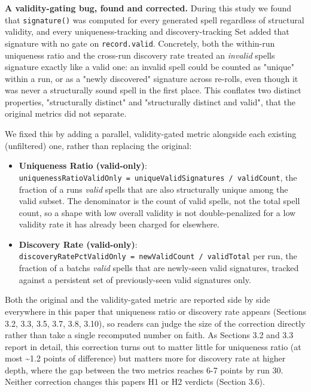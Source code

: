 \documentclass[
  10pt,
  twocolumn]{article}
\providecommand{\tightlist}{%
  \setlength{\itemsep}{0pt}\setlength{\parskip}{0pt}}
\begin{document}
\textbf{A validity-gating bug, found and corrected.} During this study
we found that \texttt{signature()} was computed for every generated
spell regardless of structural validity, and every uniqueness-tracking
and discovery-tracking Set added that signature with no gate on
\texttt{record.valid}. Concretely, both the within-run uniqueness ratio
and the cross-run discovery rate treated an \emph{invalid}
spell\textquotesingle s signature exactly like a valid one: an invalid
spell could be counted as "unique" within a run, or as a "newly
discovered" signature across re-rolls, even though it was never a
structurally sound spell in the first place. This conflates two distinct
properties, "structurally distinct" and "structurally distinct and
valid", that the original metrics did not separate.

We fixed this by adding a parallel, validity-gated metric alongside each
existing (unfiltered) one, rather than replacing the original:

\begin{itemize}
\tightlist
\item
  \textbf{Uniqueness Ratio (valid-only)}:
  \texttt{uniquenessRatioValidOnly\ =\ uniqueValidSignatures\ /\ validCount},
  the fraction of a run\textquotesingle s \emph{valid} spells that are
  also structurally unique among the valid subset. The denominator is
  the count of valid spells, not the total spell count, so a shape with
  low overall validity is not double-penalized for a low validity rate
  it has already been charged for elsewhere.
\item
  \textbf{Discovery Rate (valid-only)}:
  \texttt{discoveryRatePctValidOnly\ =\ newValidCount\ /\ validTotal}
  per run, the fraction of a batch\textquotesingle s \emph{valid} spells
  that are newly-seen valid signatures, tracked against a persistent set
  of previously-seen valid signatures only.
\end{itemize}

Both the original and the validity-gated metric are reported side by
side everywhere in this paper that uniqueness ratio or discovery rate
appears (Sections 3.2, 3.3, 3.5, 3.7, 3.8, 3.10), so readers can judge
the size of the correction directly rather than take a single recomputed
number on faith. As Sections 3.2 and 3.3 report in detail, this
correction turns out to matter little for uniqueness ratio (at most
\textasciitilde1.2 points of difference) but matters more for discovery
rate at higher depth, where the gap between the two metrics reaches 6-7
points by run 30. Neither correction changes this
paper\textquotesingle s H1 or H2 verdicts (Section 3.6).
\end{document}
